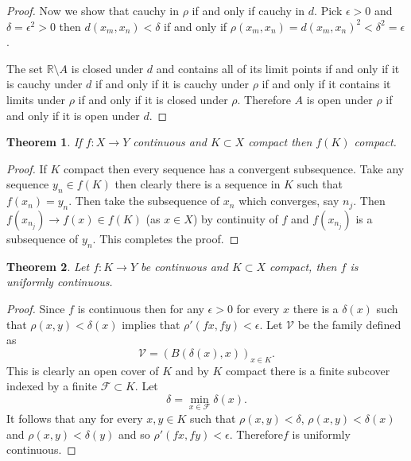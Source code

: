 \documentclass[letter]{article}
\newtheorem{theorem}{Theorem}
\newenvironment{menumerate}{%
  \edef\backupindent{\the\parindent}%
  \enumerate%
  \setlength{\parindent}{\backupindent}%
}{\endenumerate}
\begin{document}
\begin{menumerate}
\begin{proof}
			Now we show that cauchy in $\rho$ if and only if cauchy in $d.$ Pick $\epsilon >0$ and $\delta = \epsilon^2 > 0$ then $d(x_m, x_n) < \delta$ if and only if $\rho(x_m, x_n) =d(x_m, x_n)^2 < \delta^2 = \epsilon$.

			The set $\mathbb{R} \setminus A$ is closed under $d$ and contains all of its limit points if and only if it is cauchy under $d$ if and only if it is cauchy under $\rho$ if and only if it contains it limits under $\rho$ if and only if it is closed under $\rho$. Therefore $A$ is open under $\rho$ if and only if it is open under $d$.
		\end{proof}

		\item
		\begin{theorem}
			If $f: X \to Y$ continuous and $K \subset X$ compact then $f(K)$ compact.
		\end{theorem}
		\begin{proof}
			If $K$ compact then every sequence has a convergent subsequence. Take any sequence $y_n \in f(K)$ then clearly there is a sequence in $K$ such that $f(x_n) = y_n.$ Then take the subsequence of $x_n$ which converges, say $n_j$. Then $f(x_{n_j}) \to f(x) \in f(K)$ (as $x \in X$) by continuity of $f$ and $f(x_{n_j})$ is a subsequence of $y_n$. This completes the proof.	
		\end{proof}
		\item
		\begin{theorem}
			Let $f: K \to Y$ be continuous and $K \subset X$ compact, then $f$ is uniformly continuous.
		\end{theorem}
		\begin{proof}
			Since $f$ is continuous then for any $\epsilon >0$ for every $x$ there is a $\delta(x)$ such that $\rho(x,y) < \delta(x)$ implies that $\rho'(fx, fy) < \epsilon.$
			Let $\mathcal{V}$ be the family defined as
			\begin{equation}
				\mathcal{V} = \left(B(\delta(x), x)\right)_{x \in K}.	
			\end{equation}	
			This is clearly an open cover of $K$ and by $K$ compact there is a finite subcover indexed by a finite $\mathcal{F} \subset K$. Let \begin{equation}
				\delta = \min_{x \in \mathcal{F}} \delta(x).
			\end{equation}
			It follows that any for every $x, y \in K$ such that $\rho(x,y) < \delta$, $\rho(x,y) < \delta(x)$ and $\rho(x,y) < \delta(y)$ and so $\rho'(fx,fy) < \epsilon.$ Therefore$f$ is uniformly continuous.
		\end{proof}

\end{menumerate}

\end{document}
